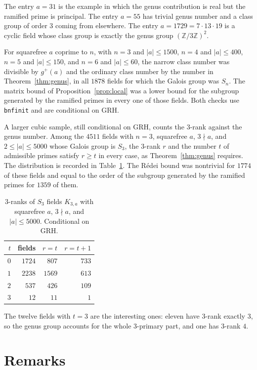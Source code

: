 \documentclass[11pt]{article}
\theoremstyle{definition}
\theoremstyle{remark}
\newcommand{\Z}{\mathbb{Z}}
\begin{document}
The entry $a=31$ is the example in which the genus contribution is real but the
ramified prime is principal. The entry $a=55$ has trivial genus number and a
class group of order $3$ coming from elsewhere. The entry $a=1729=7\cdot 13\cdot 19$
is a cyclic field whose class group is exactly the genus group $(\Z/3\Z)^{2}$.

For squarefree $a$ coprime to $n$, with $n=3$ and $|a|\le 1500$, $n=4$ and
$|a|\le 400$, $n=5$ and $|a|\le 150$, and $n=6$ and $|a|\le 60$, the narrow class
number was divisible by $g^{+}(a)$ and the ordinary class number by the number in
Theorem~\ref{thm:genus}, in all $1878$ fields for which the Galois group was
$S_n$. The matrix bound of Proposition~\ref{prop:local} was a lower bound for the
subgroup generated by the ramified primes in every one of those fields. Both
checks use \texttt{bnfinit} and are conditional on GRH.

A larger cubic sample, still conditional on GRH, counts the $3$-rank against the
genus number. Among the $4511$ fields with $n=3$, squarefree $a$, $3\nmid a$, and
$2\le|a|\le 5000$ whose Galois group is $S_3$, the $3$-rank $r$ and the number
$t$ of admissible primes satisfy $r\ge t$ in every case, as
Theorem~\ref{thm:genus} requires. The distribution is recorded in
Table~\ref{tab:rank}. The R\'edei bound was nontrivial for $1774$ of these fields
and equal to the order of the subgroup generated by the ramified primes for
$1359$ of them.

\begin{table}[ht]
\centering
\caption{$3$-ranks of $S_3$ fields $K_{3,a}$ with squarefree $a$, $3\nmid a$,
and $|a|\le 5000$. Conditional on GRH.}
\label{tab:rank}
\small
\begin{tabular}{@{}rrrr@{}}
\toprule
$t$ & fields & $r=t$ & $r=t+1$\\
\midrule
$0$ & $1724$ & $807$ & $733$\\
$1$ & $2238$ & $1569$ & $613$\\
$2$ & $537$ & $426$ & $109$\\
$3$ & $12$ & $11$ & $1$\\
\bottomrule
\end{tabular}
\end{table}

The twelve fields with $t=3$ are the interesting ones: eleven have $3$-rank
exactly $3$, so the genus group accounts for the whole $3$-primary part, and one
has $3$-rank $4$.

\section{Remarks}
\end{document}
